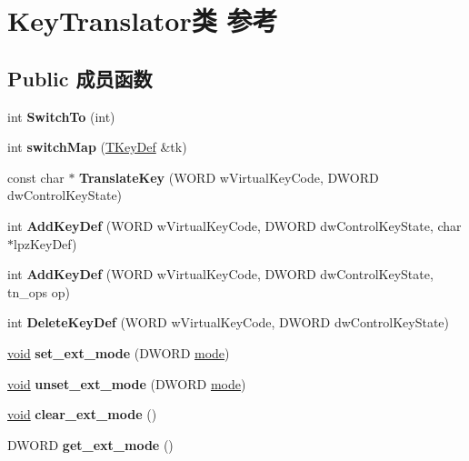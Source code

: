 \hypertarget{class_key_translator}{}\section{Key\+Translator类 参考}
\label{class_key_translator}
\subsection*{Public 成员函数}
\begin{DoxyCompactItemize}
\item 
\mbox{\label{class_key_translator_a5dfea2b2336e02257327eecbee7affa9}} 
int {\bfseries Switch\+To} (int)
\item 
\mbox{\label{class_key_translator_a812dd7c689e575fc5657ce74ca89e84f}} 
int {\bfseries switch\+Map} (\hyperlink{class_t_key_def}{T\+Key\+Def} \&tk)
\item 
\mbox{\label{class_key_translator_a73e18bb91dc0c4fbbc2d9633a40bfb42}} 
const char $\ast$ {\bfseries Translate\+Key} (W\+O\+RD w\+Virtual\+Key\+Code, D\+W\+O\+RD dw\+Control\+Key\+State)
\item 
\mbox{\label{class_key_translator_aace24d7334b0aa9075d7cc319d13c3df}} 
int {\bfseries Add\+Key\+Def} (W\+O\+RD w\+Virtual\+Key\+Code, D\+W\+O\+RD dw\+Control\+Key\+State, char $\ast$lpz\+Key\+Def)
\item 
\mbox{\label{class_key_translator_ac1b8bccf3983b8fb0a6f2d62cc1e91b7}} 
int {\bfseries Add\+Key\+Def} (W\+O\+RD w\+Virtual\+Key\+Code, D\+W\+O\+RD dw\+Control\+Key\+State, tn\+\_\+ops op)
\item 
\mbox{\label{class_key_translator_a008abd382a421f3fd9627c30d2cc3d11}} 
int {\bfseries Delete\+Key\+Def} (W\+O\+RD w\+Virtual\+Key\+Code, D\+W\+O\+RD dw\+Control\+Key\+State)
\item 
\mbox{\label{class_key_translator_afb6463f8a3f50881a961807eed4e5d8b}} 
\hyperlink{interfacevoid}{void} {\bfseries set\+\_\+ext\+\_\+mode} (D\+W\+O\+RD \hyperlink{interfacevoid}{mode})
\item 
\mbox{\label{class_key_translator_aad9bb73a4108e5c44980d508d3f6dc65}} 
\hyperlink{interfacevoid}{void} {\bfseries unset\+\_\+ext\+\_\+mode} (D\+W\+O\+RD \hyperlink{interfacevoid}{mode})
\item 
\mbox{\label{class_key_translator_a541c675ad5e273f17dbff5fbbc024f14}} 
\hyperlink{interfacevoid}{void} {\bfseries clear\+\_\+ext\+\_\+mode} ()
\item 
\mbox{\label{class_key_translator_affbe8e7c3c7ac8af4ed0df9a2f3bbdc0}} 
D\+W\+O\+RD {\bfseries get\+\_\+ext\+\_\+mode} ()
\end{DoxyCompactItemize}
